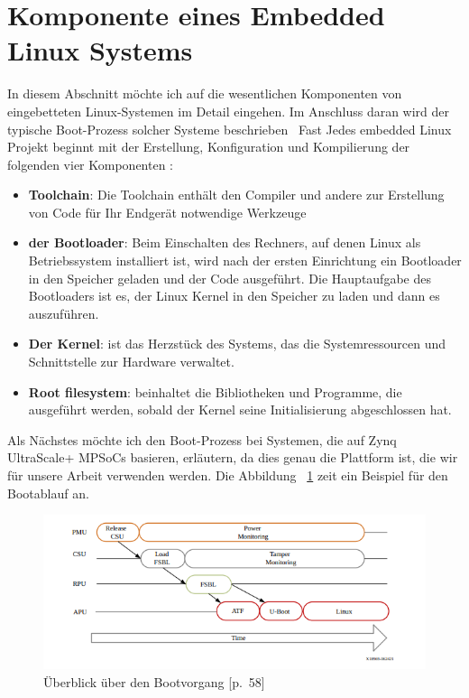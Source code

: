 \section{Komponente eines Embedded Linux Systems}
\label{cha:tech_grund:sec:Komponente_eines_Emb_Lin_Sys}
In diesem Abschnitt möchte ich auf die wesentlichen Komponenten von eingebetteten Linux-Systemen im Detail eingehen. Im Anschluss daran wird der typische Boot-Prozess solcher Systeme beschrieben 
Fast Jedes embedded Linux Projekt beginnt mit der Erstellung, Konfiguration und Kompilierung der folgenden vier Komponenten \cite{Dervis2013}:
\begin{itemize}
	\item \textbf{Toolchain}: Die Toolchain enthält den Compiler und andere zur Erstellung von Code für Ihr Endgerät notwendige Werkzeuge
	\item \textbf{der Bootloader}: Beim Einschalten des Rechners, auf denen Linux als Betriebssystem installiert ist, wird nach der ersten Einrichtung ein Bootloader in den Speicher geladen und der Code ausgeführt. Die Hauptaufgabe des Bootloaders ist es, der Linux Kernel in den Speicher zu laden und dann es auszuführen. 
	\item \textbf{Der Kernel}: ist das Herzstück des Systems, das die Systemressourcen und Schnittstelle zur Hardware verwaltet.
	\item \textbf{Root filesystem}: beinhaltet die Bibliotheken und Programme, die ausgeführt werden, sobald der Kernel seine Initialisierung abgeschlossen hat.
\end{itemize}
Als Nächstes möchte ich den Boot-Prozess bei Systemen, die auf Zynq UltraScale+ MPSoCs basieren, erläutern, da dies genau die Plattform ist, die wir für unsere Arbeit verwenden werden. Die Abbildung ~\ref{fig:boot:process} zeit ein Beispiel für den Bootablauf an.

\begin{figure}[h]
	\begin{center}
		\includegraphics[width=1.1\textwidth]{./images/boot-flow.jpg}
	\end{center}
	\vspace{-5pt}
	\caption[der Bootvorgang bei zynq+MPSoCs]{Überblick über den Bootvorgang \cite{Xilinx2017}[p.~58]} %
	\label{fig:boot:process}
	\vspace{-5pt}
\end{figure}

